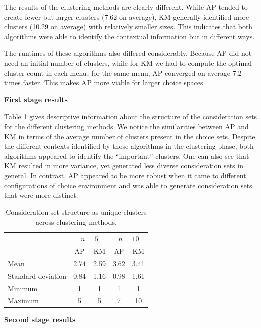 \documentclass[a4paper,12pt]{article}
\begin{document}
The results of the clustering methods are clearly different. While AP tended to create fewer but larger clusters (7.62 on average), KM generally identified more clusters (10.29 on average)  with relatively smaller sizes. This indicates that both algorithms were able to identify the contextual information but in different ways. 

The runtimes of these algorithms also differed considerably. Because AP did not need an initial number of clusters, while for KM we had to compute the optimal cluster count in each menu, for the same menu, AP converged on average 7.2 times faster. This makes AP more viable for larger choice spaces.

\textbf{First stage results}

Table \ref{tab:desciptiveResultsTwoStageChoiceModelFirstStage} gives descriptive information about the structure of the consideration sets for the different clustering methods. We notice the similarities between AP and KM in terms of the average number of clusters present in the choice sets. Despite the different contexts identified by those algorithms in the clustering phase, both algorithms appeared to identify the ``important'' clusters. One can also see that KM resulted in more variance, yet generated less diverse consideration sets in general. In contrast, AP appeared to be more robust when it came to different configurations of choice environment and was able to generate consideration sets that were more distinct. 


\begin{table}[!h]
    \centering
    \begin{tabular}{lcccc}\hline
     & \multicolumn{2}{c}{$n=5$} & \multicolumn{2}{c}{$n=10$}\\
     & AP & KM & AP & KM\\\hline
    Mean & 2.74 & 2.59 & 3.62 & 3.41\\
    Standard deviation\hspace{5mm} & 0.84 & 1.16 & 0.98 & 1.61\\
    Minimum & 1 & 1 & 1 & 1\\
    Maximum & 5 & 5 & 7 & 10\\\hline
    \end{tabular}
    \caption{Consideration set structure as unique clusters across clustering methods.}
    \label{tab:desciptiveResultsTwoStageChoiceModelFirstStage}
\end{table}

\textbf{Second stage results}
\end{document}
